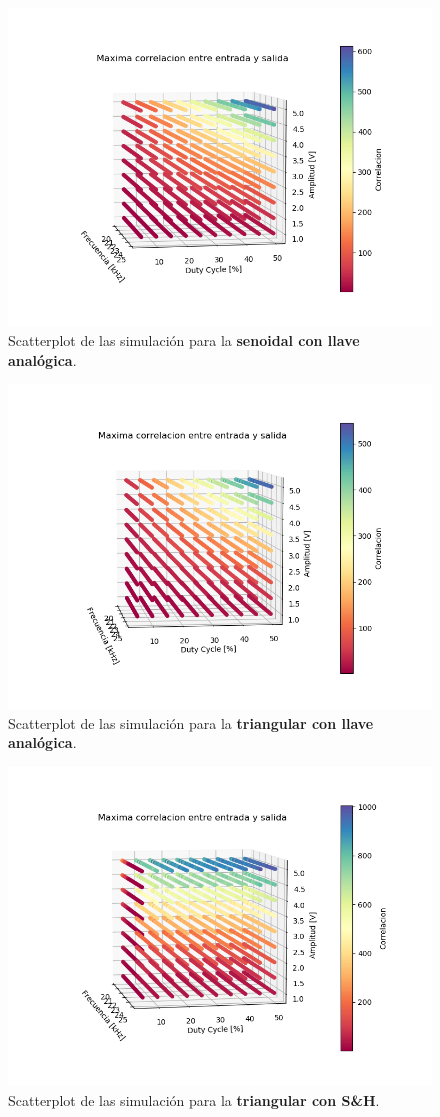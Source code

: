 \begin{figure}[H]
\centering
	\includegraphics[width=0.8\linewidth]{ImagenesEjercicio6/scatter_llave_seno.png}
	\caption{Scatterplot de las simulación para la \textbf{senoidal con llave analógica}.}
	\label{seno_llave}
\end{figure}

\begin{figure}[H]
\centering
	\includegraphics[width=0.8\linewidth]{ImagenesEjercicio6/scatter_llave_triang.png}
	\caption{Scatterplot de las simulación para la \textbf{triangular con llave analógica}.}
	\label{triang_llave}
\end{figure}

\begin{figure}[H]
\centering
	\includegraphics[width=0.8\linewidth]{ImagenesEjercicio6/scatter_sh_triang.png}
	\caption{Scatterplot de las simulación para la \textbf{triangular con S\&H}.}
	\label{triang_sh}
\end{figure}

